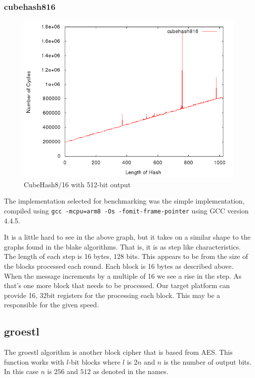 \documentclass[10pt,a4paper]{article}
\begin{document}
\subsubsection{cubehash816}
    \begin{figure}[H]
        \begin{center}
            \includegraphics[scale=0.5]{images/cubehash816.png} 
            \caption{CubeHash8/16 with 512-bit output}
        \end{center}
    \end{figure}

The implementation selected for benchmarking was the simple implementation,
compiled using \texttt{gcc -mcpu=arm8 -Os -fomit-frame-pointer} using GCC
version 4.4.5.

It is a little hard to see in the above graph, but it takes on a similar shape to the graphs found in the blake algorithms. That is, it is as step like characteristics. The length of each step is 16 bytes, 128 bits. This appears to be from the size of the blocks processed each round. Each block is 16 bytes as described above. When the message increments by a multiple of 16 we see a rise in the step. As that's one more block that needs to be processed.  
Our target platform can provide 16, 32bit registers for the processing each block. This may be a responsible for the given speed.

\subsection{groestl}

The groestl algorithm is another block cipher that is based from AES. This
function works with $l$-bit blocks where $l$ is $2n$ and $n$ is the number of output
bits. In this case $n$ is $256$ and $512$ as denoted in the names. 
\end{document}
